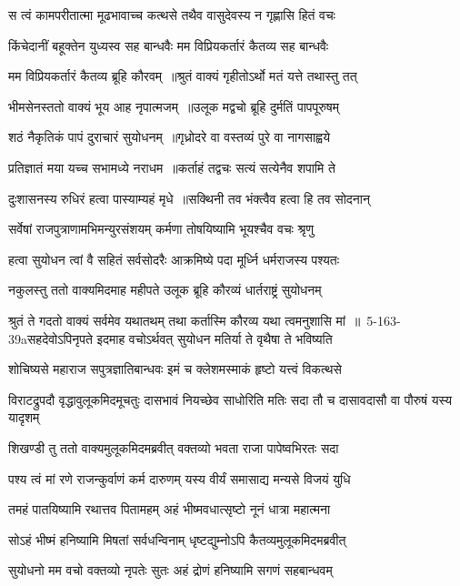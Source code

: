 \threelineshloka
{स त्वं कामपरीतात्मा मूढभावाच्च कत्थसे}
{तथैव वासुदेवस्य न गृह्णासि हितं वचः}
{}


\threelineshloka
{किंचेदानीं बहूक्तेन युध्यस्व सह बान्धवैः}
{मम विप्रियकर्तारं कैतव्य सह बान्धवैः}
{}


\twolineshloka
{मम विप्रियकर्तारं कैतव्य ब्रूहि कौरवम् ॥श्रुतं वाक्यं गृहीतोऽर्थो मतं यत्ते तथास्तु तत्}
{}


\twolineshloka
{भीमसेनस्ततो वाक्यं भूय आह नृपात्मजम् ॥उलूक मद्वचो ब्रूहि दुर्मतिं पापपूरुषम्}
{}


\twolineshloka
{शठं नैकृतिकं पापं दुराचारं सुयोधनम् ॥गृध्रोदरे वा वस्तव्यं पुरे वा नागसाह्वये}
{}


\twolineshloka
{प्रतिज्ञातं मया यच्च सभामध्ये नराधम ॥कर्ताहं तद्वचः सत्यं सत्येनैव शपामि ते}
{}


\twolineshloka
{दुःशासनस्य रुधिरं हत्वा पास्याम्यहं मृधे ॥सक्थिनी तव भंक्त्वैव हत्वा हि तव सोदनान्}
{}


\twolineshloka
{सर्वेषां राजपुत्राणामभिमन्युरसंशयम्}
{कर्मणा तोषयिष्यामि भूयश्चैव वचः श्रृणु}


\twolineshloka
{हत्वा सुयोधन त्वां वै सहितं सर्वसोदरैः}
{आक्रमिष्ये पदा मूर्ध्नि धर्मराजस्य पश्यतः}


\twolineshloka
{नकुलस्तु ततो वाक्यमिदमाह महीपते}
{उलूक ब्रूहि कौरव्यं धार्तराष्ट्रं सुयोधनम्}


\threelineshloka
{श्रुतं ते गदतो वाक्यं सर्वमेव यथातथम्}
{तथा कर्तास्मि कौरव्य यथा त्वमनुशासि मां ॥ 5-163-39aसहदेवोऽपिनृपते इदमाह वचोऽर्थवत्}
{सुयोधन मतिर्या ते वृथैषा ते भविष्यति}


\twolineshloka
{शोचिष्यसे महाराज सपुत्रज्ञातिबान्धवः}
{इमं च क्लेशमस्माकं हृष्टो यत्त्वं विकत्थसे}


\threelineshloka
{विराटद्रुपदौ वृद्धावुलूकमिदमूचतुः}
{दासभावं नियच्छेव साधोरिति मतिः सदा}
{तौ च दासावदासौ वा पौरुषं यस्य यादृशम्}


\twolineshloka
{शिखण्डी तु ततो वाक्यमुलूकमिदमब्रवीत्}
{वक्तव्यो भवता राजा पापेष्वभिरतः सदा}


\twolineshloka
{पश्य त्वं मां रणे राजन्कुर्वाणं कर्म दारुणम्}
{यस्य वीर्यं समासाद्य मन्यसे विजयं युधि}


\twolineshloka
{तमहं पातयिष्यामि रथात्तव पितामहम्}
{अहं भीष्मवधात्सृष्टो नूनं धात्रा महात्मना}


\twolineshloka
{सोऽहं भीष्मं हनिष्यामि मिषतां सर्वधन्विनाम्}
{धृष्टद्युम्नोऽपि कैतव्यमुलूकमिदमब्रवीत्}


\twolineshloka
{सुयोधनो मम वचो वक्तव्यो नृपतेः सुतः}
{अहं द्रोणं हनिष्यामि सगणं सहबान्धवम्}


